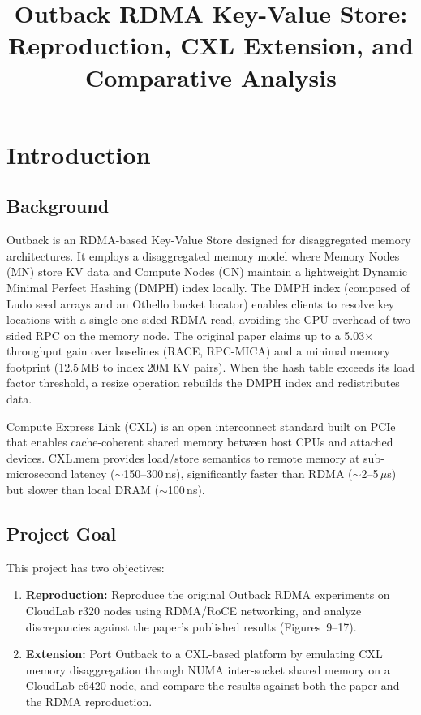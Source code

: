 \documentclass[conference]{IEEEtran}
\title{Outback RDMA Key-Value Store:\\
Reproduction, CXL Extension, and Comparative Analysis}
\author{\IEEEauthorblockN{Cheng-Shun Chuang}}
\begin{document}
\maketitle

\section{Introduction}

\subsection{Background}

Outback is an RDMA-based Key-Value Store designed for disaggregated memory architectures. It employs a disaggregated memory model where Memory Nodes (MN) store KV data and Compute Nodes (CN) maintain a lightweight Dynamic Minimal Perfect Hashing (DMPH) index locally. The DMPH index (composed of Ludo seed arrays and an Othello bucket locator) enables clients to resolve key locations with a single one-sided RDMA read, avoiding the CPU overhead of two-sided RPC on the memory node. The original paper claims up to a 5.03$\times$ throughput gain over baselines (RACE, RPC-MICA) and a minimal memory footprint (12.5\,MB to index 20M KV pairs). When the hash table exceeds its load factor threshold, a resize operation rebuilds the DMPH index and redistributes data.

Compute Express Link (CXL) is an open interconnect standard built on PCIe that enables cache-coherent shared memory between host CPUs and attached devices. CXL.mem provides load/store semantics to remote memory at sub-microsecond latency ($\sim$150--300\,ns), significantly faster than RDMA ($\sim$2--5\,$\mu$s) but slower than local DRAM ($\sim$100\,ns).

\subsection{Project Goal}

This project has two objectives:
\begin{enumerate}[nosep]
  \item \textbf{Reproduction:} Reproduce the original Outback RDMA experiments on CloudLab r320 nodes using RDMA/RoCE networking, and analyze discrepancies against the paper's published results (Figures~9--17).
  \item \textbf{Extension:} Port Outback to a CXL-based platform by emulating CXL memory disaggregation through NUMA inter-socket shared memory on a CloudLab c6420 node, and compare the results against both the paper and the RDMA reproduction.
\end{enumerate}
\end{document}
